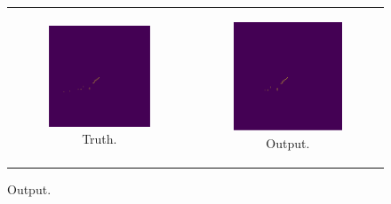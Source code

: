 \begin{figure}
	\begin{tabularx}{\textwidth}{cc}
		\begin{subfigure}[b]{0.49\textwidth}
			\centering
			\vspace{3mm}
			\includegraphics[width=\textwidth]{figures/unet_example_true.pdf}
			\caption {Truth.}
			\label{fig:unet_example_true}
		\end{subfigure} &
		\begin{subfigure}[b]{0.49\textwidth}
			\centering
			\vspace{3mm}
			\includegraphics[width=\textwidth]{figures/unet_example_pred.pdf}
			\caption {Output.}
			\label{fig:unet_example_pred}
		\end{subfigure}
	\end{tabularx}


\end{figure}
